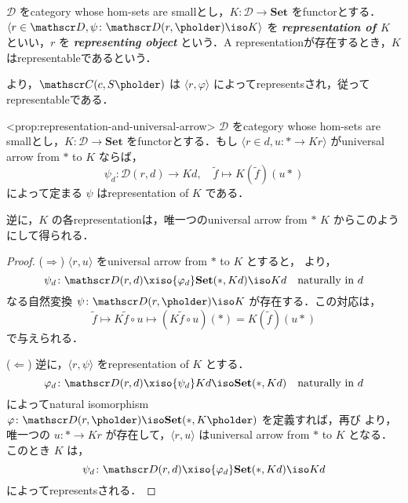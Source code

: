 \documentclass{naughieLuatex}
\newcommand\cat\mathscr
\renewcommand\defterm[1]{ \textbf{\emph{#1}} }
\newcommand\opair[2]{\langle #1, #2 \rangle}
\newcommand\ext\tilde
\newcommand\onept\ast
\newcommand\catb\mathbf
\newcommand\Set{\catb{Set}}
\begin{document}
\begin{define}
  $\cat D$ をcategory whose hom-sets are smallとし，$K \colon \cat D \to \Set$ をfunctorとする．$\opair{r \in \cat D}{\psi \colon \cat D (r, \pholder) \iso K}$ を\defterm{representation of $K$}といい，$r$ を\defterm{representing object}という．A representationが存在するとき，$K$ はrepresentableであるという．
\end{define}

 より，$\cat C (c, S \pholder)$ は $\opair{r}{\varphi}$ によってrepresentsされ，従ってrepresentableである．

\begin{prop}<prop:representation-and-universal-arrow>
  $\cat D$ をcategory whose hom-sets are smallとし，$K \colon \cat D \to \Set$ をfunctorとする．もし $\opair{r \in d}{u \colon \onept \to K r}$ がuniversal arrow from $\onept$ to $K$ ならば，
  \[
    \psi_d \colon \cat D (r, d) \to K d, \quad \ext f \mapsto K (\ext f) (u \onept)
  \]
  によって定まる $\psi$ はrepresentation of $K$ である．

  逆に，$K$ の各representationは，唯一つのuniversal arrow from $\onept$ \to $K$ からこのようにして得られる．
\end{prop}

\begin{proof}
  ($\Longrightarrow$)
  $\opair r u$ をuniversal arrow from $\onept$ to $K$ とすると， より，
  \[
    \psi_d \colon \cat D (r, d) \xiso{\varphi_d} \Set (\onept, K d) \iso K d \quad \text{naturally in}\ d
  \]
  なる自然変換 $\psi \colon \cat D (r, \pholder) \iso K$ が存在する．この対応は，
  \[
    \ext f \mapsto K \ext f \circ u \mapsto (K \ext f \circ u) (\onept) = K (\ext f) (u \onept)
  \]
  で与えられる．

  ($\Longleftarrow$)
  逆に，$\opair{r}{\psi}$ をrepresentation of $K$ とする．
  \[
    \varphi_d \colon \cat D (r, d) \xiso{\psi_d} K d \iso \Set (\onept, K d) \quad \text{naturally in}\ d
  \]
  によってnatural isomorphism $\varphi \colon \cat D (r, \pholder) \iso \Set (\onept, K \pholder)$ を定義すれば，再び  より，唯一つの $u \colon \onept \to K r$ が存在して，$\opair{r}{u}$ はuniversal arrow from $\onept$ to $K$ となる．このとき $K$ は，
  \[
    \psi_d \colon \cat D (r, d) \xiso{\varphi_d} \Set (\onept, K d) \iso K d
  \]
  によってrepresentsされる．
\end{proof}
\end{document}
